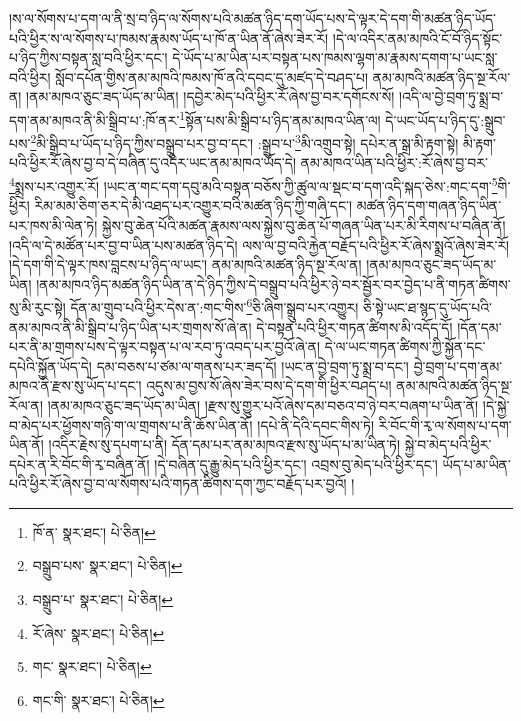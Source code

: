 །ས་ལ་སོགས་པ་དག་ལ་ནི་སྲ་བ་ཉིད་ལ་སོགས་པའི་མཚན་ཉིད་དག་ཡོད་པས་དེ་ལྟར་དེ་དག་གི་མཚན་ཉིད་ཡོད་པའི་ཕྱིར་ས་ལ་སོགས་པ་ཁམས་རྣམས་ཡོད་པ་ཁོ་ན་ཡིན་ནོ་ཞེས་ཟེར་རོ། །དེ་ལ་འདིར་ནམ་མཁའི་ངོ་བོ་ཉིད་སྟོང་པ་ཉིད་ཀྱིས་བསྟན་སླ་བའི་ཕྱིར་དང་། དེ་ཡོད་པ་མ་ཡིན་པར་བསྟན་པས་ཁམས་ལྷག་མ་རྣམས་དགག་པ་ཡང་སླ་བའི་ཕྱིར། སློབ་དཔོན་གྱིས་ནམ་མཁའི་ཁམས་ཁོ་ནའི་དབང་དུ་མཛད་དེ་བཤད་པ། ནམ་མཁའི་མཚན་ཉིད་སྔ་རོལ་ན། །ནམ་མཁའ་ཅུང་ཟད་ཡོད་མ་ཡིན། །དབྱེར་མེད་པའི་ཕྱིར་རོ་ཞེས་བྱ་བར་དགོངས་སོ། །འདི་ལ་བྱེ་བྲག་ཏུ་སྨྲ་བ་དག་ནམ་མཁའ་ནི་མི་སྒྲིབ་པ་:ཁོ་ནར་\footnote{ཁོ་ན་  སྣར་ཐང་།  པེ་ཅིན། }སྟོན་པས་མི་སྒྲིབ་པ་ཉིད་ནམ་མཁའ་ཡིན་ལ། དེ་ཡང་ཡོད་པ་ཉིད་དུ་:སྒྲུབ་པས་\footnote{བསྒྲུབ་པས་  སྣར་ཐང་།  པེ་ཅིན། }མི་སྒྲིབ་པ་ཡོད་པ་ཉིད་ཀྱིས་བསྒྲུབ་པར་བྱ་བ་དང་། :སྒྲུབ་པ་\footnote{བསྒྲུབ་པ་  སྣར་ཐང་།  པེ་ཅིན། }མི་འགྲུབ་སྟེ། དཔེར་ན་སྒྲ་མི་རྟག་སྟེ། མི་རྟག་པའི་ཕྱིར་རོ་ཞེས་བྱ་བ་དེ་བཞིན་དུ་འདིར་ཡང་ནམ་མཁའ་ཡོད་དེ། ནམ་མཁའ་ཡིན་པའི་ཕྱིར་:རོ་ཞེས་བྱ་བར་\footnote{རོ་ཞེས་  སྣར་ཐང་།  པེ་ཅིན། }སྨྲས་པར་འགྱུར་རོ། །ཡང་ན་གང་དག་དབུ་མའི་བསྟན་བཅོས་ཀྱི་ཚུལ་ལ་སྡང་བ་དག་འདི་སྐད་ཅེས་:གང་དག་\footnote{གང་  སྣར་ཐང་།  པེ་ཅིན། }གི་ཕྱིར། རིམ་མམ་ཅིག་ཅར་དེ་མི་འཐད་པར་འགྱུར་བའི་མཚན་ཉིད་ཀྱི་གཞི་དང་། མཚན་ཉིད་དག་གཞན་ཉིད་ཡིན་པར་ཁས་མི་ལེན་ཏེ། སྐྱེས་བུ་ཆེན་པོའི་མཚན་རྣམས་ལས་སྐྱེས་བུ་ཆེན་པོ་གཞན་ཡིན་པར་མི་རིགས་པ་བཞིན་ནོ། །འདི་ལ་དེ་མཚོན་པར་བྱ་བ་ཡིན་པས་མཚན་ཉིད་དེ། ལས་ལ་བྱ་བའི་རྐྱེན་བརྗོད་པའི་ཕྱིར་རོ་ཞེས་སྨྲའོ་ཞེས་ཟེར་རོ། །དེ་དག་གི་དེ་ལྟར་ཁས་བླངས་པ་ཉིད་ལ་ཡང་། ནམ་མཁའི་མཚན་ཉིད་སྔ་རོལ་ན། །ནམ་མཁའ་ཅུང་ཟད་ཡོད་མ་ཡིན། །ནམ་མཁའ་ཉིད་མཚན་ཉིད་ཡིན་ན་དེ་ཉིད་ཀྱིས་དེ་བསྒྲུབ་པའི་ཕྱིར་ཉེ་བར་སྦྱོར་བར་བྱེད་པ་ནི་གཏན་ཚིགས་སུ་མི་རུང་སྟེ། དོན་མ་གྲུབ་པའི་ཕྱིར་དེས་ན་:གང་གིས་\footnote{གང་གི་  སྣར་ཐང་།  པེ་ཅིན། }ཅི་ཞིག་སྒྲུབ་པར་འགྱུར། ཅི་སྟེ་ཡང་ཐ་སྙད་དུ་ཡོད་པའི་ནམ་མཁའ་ནི་མི་སྒྲིབ་པ་ཉིད་ཡིན་པར་གྲགས་སོ་ཞེ་ན། དེ་བསྟན་པའི་ཕྱིར་གཏན་ཚིགས་མི་འདོད་དོ། །དོན་དམ་པར་ནི་མ་གྲགས་པས་དེ་ལྟར་བསྟན་པ་ལ་རབ་ཏུ་འབད་པར་བྱའོ་ཞེ་ན། དེ་ལ་ཡང་གཏན་ཚིགས་ཀྱི་སྐྱོན་དང་དཔེའི་སྐྱོན་ཡོད་དེ། དམ་བཅས་པ་ཙམ་ལ་གནས་པར་ཟད་དོ། །ཡང་ན་བྱེ་བྲག་ཏུ་སྨྲ་བ་དང་། བྱེ་བྲག་པ་དག་ནམ་མཁའ་ནི་རྫས་སུ་ཡོད་པ་དང་། འདུས་མ་བྱས་སོ་ཞེས་ཟེར་བས་དེ་དག་གི་ཕྱིར་བཤད་པ། ནམ་མཁའི་མཚན་ཉིད་སྔ་རོལ་ན། །ནམ་མཁའ་ཅུང་ཟད་ཡོད་མ་ཡིན། །རྫས་སུ་གྱུར་པའོ་ཞེས་དམ་བཅའ་བ་ཉེ་བར་བཞག་པ་ཡིན་ནོ། །དེ་སྐྱེ་བ་མེད་པར་ཕྱོགས་གཉི་ག་ལ་གྲགས་པ་ནི་ཆོས་ཡིན་ནོ། །དཔེ་ནི་དེའི་དབང་གིས་ཏེ། རི་བོང་གི་རྭ་ལ་སོགས་པ་དག་ཡིན་ནོ། །འདིར་རྗེས་སུ་དཔག་པ་ནི། དོན་དམ་པར་ནམ་མཁའ་རྫས་སུ་ཡོད་པ་མ་ཡིན་ཏེ། སྐྱེ་བ་མེད་པའི་ཕྱིར་དཔེར་ན་རི་བོང་གི་རྭ་བཞིན་ནོ། །དེ་བཞིན་དུ་རྒྱུ་མེད་པའི་ཕྱིར་དང་། འབྲས་བུ་མེད་པའི་ཕྱིར་དང་། ཡོད་པ་མ་ཡིན་པའི་ཕྱིར་རོ་ཞེས་བྱ་བ་ལ་སོགས་པའི་གཏན་ཚིགས་དག་ཀྱང་བརྗོད་པར་བྱའོ། །
